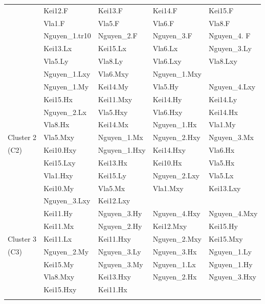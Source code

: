 \begin{table}
\begin{tabular}{lllll}
& Kei12.F & Kei13.F & Kei14.F & Kei15.F \\
& Vla1.F & Vla5.F & Vla6.F & Vla8.F \\
& Nguyen\_1.tr10 & Nguyen\_2.F & Nguyen\_3.F & Nguyen\_4. F \\
& Kei13.Lx & Kei15.Lx & Vla6.Lx & Nguyen\_3.Ly \\
& Vla5.Ly & Vla8.Ly & Vla6.Lxy & Vla8.Lxy \\
& Nguyen\_1.Lxy & Vla6.Mxy & Nguyen\_1.Mxy & \\
\hline
& Nguyen\_1.My & Kei14.My & Vla5.Hy & Nguyen\_4.Lxy \\
& Kei15.Hx & Kei11.Mxy & Kei14.Hy & Kei14.Ly \\
& Nguyen\_2.Lx & Vla5.Hxy & Vla6.Hxy & Kei14.Hx \\
& Vla8.Hx & Kei14.Mx & Nguyen\_1.Hx & Vla1.My \\
Cluster 2 & Vla5.Mxy & Nguyen\_1.Mx & Nguyen\_2.Hxy & Nguyen\_3.Mx\\
(C2) & Kei10.Hxy & Nguyen\_1.Hxy & Kei14.Hxy & Vla6.Hx \\
& Kei15.Lxy & Kei13.Hx & Kei10.Hx & Vla5.Hx \\
& Vla1.Hxy & Kei15.Ly  & Nguyen\_2.Lxy & Vla5.Lx \\
& Kei10.My & Vla5.Mx & Vla1.Mxy & Kei13.Lxy \\
& Nguyen\_3.Lxy & Kei12.Lxy & & \\
\hline
& Kei11.Hy & Nguyen\_3.Hy & Nguyen\_4.Hxy & Nguyen\_4.Mxy \\
& Kei11.Mx & Nguyen\_2.Hy & Kei12.Mxy & Kei15.Hy \\
Cluster 3 & Kei11.Lx & Kei11.Hxy & Nguyen\_2.Mxy & Kei15.Mxy \\
(C3) & Nguyen\_2.My & Nguyen\_3.Ly & Nguyen\_3.Hx & Nguyen\_1.Ly \\
& Kei15.My & Nguyen\_3.My & Nguyen\_1.Lx & Nguyen\_1.Hy \\
& Vla8.Mxy & Kei13.Hxy & Nguyen\_2.Hx & Nguyen\_3.Hxy \\
& Kei15.Hxy & Kei11.Hx & & \\

\noalign{\smallskip}\hline
\end{tabular}
\end{table}
